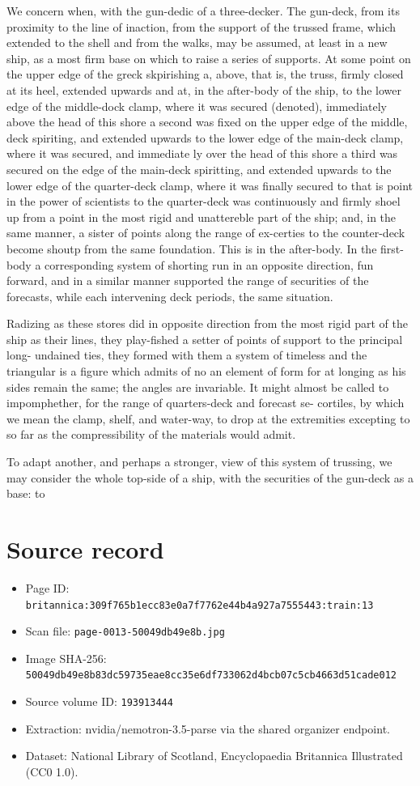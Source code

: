\documentclass{article}
\begin{document}
We concern when, with the gun-dedic of a three-decker. The gun-deck, from its proximity to the line of inaction, from the support of the trussed frame, which extended to the shell and from the walks, may be assumed, at least in a new ship, as a most firm base on which to raise a series of supports. At some point on the upper edge of the greck skpirishing a, above, that is, the truss, firmly closed at its heel, extended upwards and at, in the after-body of the ship, to the lower edge of the middle-dock clamp, where it was secured (denoted), immediately above the head of this shore a second was fixed on the upper edge of the middle, deck spiriting, and extended upwards to the lower edge of the main-deck clamp, where it was secured, and immediate ly over the head of this shore a third was secured on the edge of the main-deck spiritting, and extended upwards to the lower edge of the quarter-deck clamp, where it was finally secured to that is point in the power of scientists to the quarter-deck was continuously and firmly shoel up from a point in the most rigid and unattereble part of the ship; and, in the same manner, a sister of points along the range of ex-certies to the counter-deck become shoutp from the same foundation. This is in the after-body. In the first-body a corresponding system of shorting run in an opposite direction, fun forward, and in a similar manner supported the range of securities of the forecasts, while each intervening deck periods, the same situation.

Radizing as these stores did in opposite direction from the most rigid part of the ship as their lines, they play-fished a setter of points of support to the principal long- undained ties, they formed with them a system of timeless and the triangular is a figure which admits of no an element of form for at longing as his sides remain the same; the angles are invariable. It might almost be called to impomphether, for the range of quarters-deck and forecast se- cortiles, by which we mean the clamp, shelf, and water-way, to drop at the extremities excepting to so far as the compressibility of the materials would admit.

To adapt another, and perhaps a stronger, view of this system of trussing, we may consider the whole top-side of a ship, with the securities of the gun-deck as a base: to

\section*{Source record}
\begin{itemize}
\item Page ID: \texttt{britannica:309f765b1ecc83e0a7f7762e44b4a927a7555443:train:13}
\item Scan file: \texttt{page-0013-50049db49e8b.jpg}
\item Image SHA-256: \texttt{50049db49e8b83dc59735eae8cc35e6df733062d4bcb07c5cb4663d51cade012}
\item Source volume ID: \texttt{193913444}
\item Extraction: nvidia/nemotron-3.5-parse via the shared organizer endpoint.
\item Dataset: National Library of Scotland, Encyclopaedia Britannica Illustrated (CC0 1.0).
\end{itemize}
\end{document}
